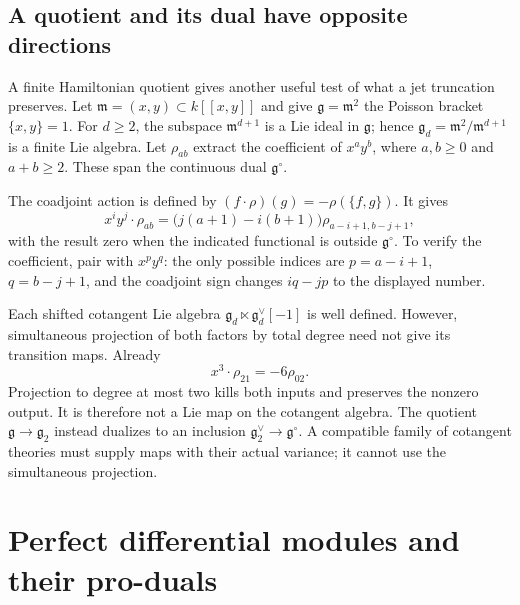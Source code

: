 \subsection{A quotient and its dual have opposite directions}

A finite Hamiltonian quotient gives another useful test of what a
jet truncation preserves. Let $\mathfrak m=(x,y)\subset k[[x,y]]$
and give $\mathfrak g=\mathfrak m^2$ the Poisson bracket
$\{x,y\}=1$. For $d\geq2$, the subspace
$\mathfrak m^{d+1}$ is a Lie ideal in $\mathfrak g$; hence
$\mathfrak g_d=\mathfrak m^2/\mathfrak m^{d+1}$ is a finite
Lie algebra. Let $\rho_{ab}$ extract the coefficient of $x^ay^b$,
where $a,b\geq0$ and $a+b\geq2$. These span the continuous dual
$\mathfrak g^\circ$.

The coadjoint action is defined by
$(f\cdot\rho)(g)=-\rho(\{f,g\})$. It gives
\begin{equation}\label{cyjets:eq:coadjoint}
 x^iy^j\cdot\rho_{ab}
 =\bigl(j(a+1)-i(b+1)\bigr)\rho_{a-i+1,b-j+1},
\end{equation}
with the result zero when the indicated functional is outside
$\mathfrak g^\circ$. To verify the coefficient, pair with $x^py^q$:
the only possible indices are $p=a-i+1$, $q=b-j+1$, and the
coadjoint sign changes $iq-jp$ to the displayed number.

Each shifted cotangent Lie algebra
$\mathfrak g_d\ltimes\mathfrak g_d^\vee[-1]$ is well defined.
However, simultaneous projection of both factors by total degree
need not give its transition maps. Already
\begin{equation}\label{cyjets:eq:cotangent-witness}
 x^3\cdot\rho_{21}=-6\rho_{02}.
\end{equation}
Projection to degree at most two kills both inputs and preserves
the nonzero output. It is therefore not a Lie map on the cotangent
algebra. The quotient $\mathfrak g\to\mathfrak g_2$ instead
dualizes to an inclusion $\mathfrak g_2^\vee\to\mathfrak g^\circ$.
A compatible family of cotangent theories must supply maps with
their actual variance; it cannot use the simultaneous projection.

\section{Perfect differential modules and their pro-duals}
\label{cyjets:sec:perfect}

